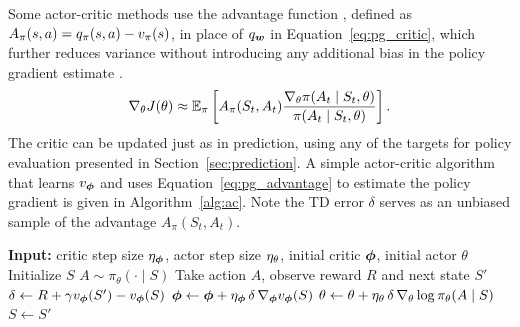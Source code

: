   Some actor-critic methods use the advantage function , defined as $A_\pi(s, a) = q_{\pi}(s, a) - v_{\pi}(s)$, in place of $q_{\bm w}$ in Equation~\eqref{eq:pg_critic}, which further reduces variance without introducing any additional bias in the policy gradient estimate \cite{sutton1998introduction}.
  \begin{equation}
      \nabla_\theta J(\theta) \approx \operatorname{\mathbb{E}}_\pi \left[ A_\pi(S_t, A_t) \frac{\nabla_\theta \pi(A_t \mid S_t, \theta)}{\pi(A_t \mid S_t, \theta)} \right].
      \label{eq:pg_advantage}
  \end{equation}
  The critic can be updated just as in prediction, using any of the targets for policy evaluation presented in Section~\ref{sec:prediction}. A simple actor-critic algorithm that learns $v_{\bm \phi}$ and uses Equation~\eqref{eq:pg_advantage} to estimate the policy gradient is given in Algorithm~\ref{alg:ac}. Note the TD error $\delta$ serves as an unbiased sample of the advantage $A_\pi(S_t, A_t)$.
  
  \begin{algorithm}[t]
  \caption{Actor-Critic with Advantage and TD(0) Target}
  \label{alg:ac}
  \begin{algorithmic}[1]
  \State \textbf{Input:} critic step size $\eta_{{\bm \phi}}$, actor step size $\eta_\theta$, initial critic ${\bm \phi}$, initial actor $\theta$
      \State Initialize $S$
          \State $A \sim \pi_\theta(\cdot \mid S)$
          \State Take action $A$, observe reward $R$ and next state $S'$
          \State $\delta \gets R + \gamma v_{\bm \phi}(S') - v_{\bm \phi}(S)$ 
          \State ${\bm \phi} \gets {\bm \phi} + \eta_{{\bm \phi}}\, \delta\, \nabla_{{\bm \phi}} v_{\bm \phi}(S)$
          \State $\theta \gets \theta + \eta_\theta\, \delta\, \nabla_\theta \log \pi_\theta(A \mid S)$
          \State $S \gets S'$
      \EndWhile
  \EndFor
  \end{algorithmic}
  \end{algorithm}
  
